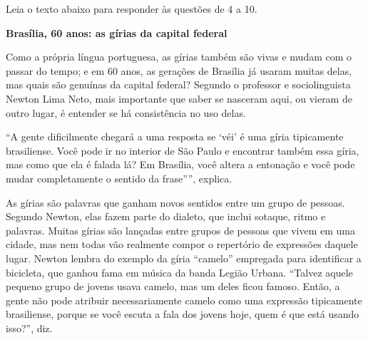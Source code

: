 

Leia o texto abaixo para responder às questões de 4 a 10.

\begin{myquote}

\textbf{Brasília, 60 anos: as gírias da capital federal}

Como a própria língua portuguesa, as gírias também são vivas e mudam com o
passar do tempo; e em 60 anos, as gerações de Brasília já usaram muitas delas,
mas quais são genuínas da capital federal? Segundo o professor e
sociolinguista Newton Lima Neto, mais importante que saber se nasceram aqui,
ou vieram de outro lugar, é entender se há consistência no uso delas.

``A gente dificilmente chegará a uma resposta se `véi' é uma gíria tipicamente
brasiliense. Você pode ir no interior de São Paulo e encontrar também essa
gíria, mas como que ela é falada lá? Em Brasília, você altera a entonação e
você pode mudar completamente o sentido da frase''”, explica.

As gírias são palavras que ganham novos sentidos entre um grupo de pessoas.
Segundo Newton, elas fazem parte do dialeto, que inclui sotaque, ritmo e
palavras. Muitas gírias são lançadas entre grupos de pessoas que vivem em uma cidade,
mas nem todas vão realmente compor o repertório de expressões daquele lugar.
Newton lembra do exemplo da gíria ``camelo'' empregada para identificar a
bicicleta, que ganhou fama em música da banda Legião Urbana. ``Talvez aquele
pequeno grupo de jovens usava camelo, mas um deles ficou famoso. Então, a
gente não pode atribuir necessariamente camelo como uma expressão tipicamente
brasiliense, porque se você escuta a fala dos jovens hoje, quem é que está
usando isso?'', diz.


\end{myquote}

